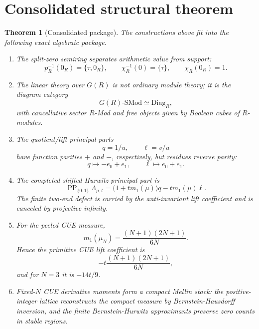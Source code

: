 \documentclass[11pt]{article}
\newcommand{\PP}{\operatorname{PP}}
\newcommand{\ellp}{\ell}
\newcommand{\1}{\mathbf 1}
\newcommand{\SMod}{\mathrm{SMod}}
\newcommand{\Diag}{\mathrm{Diag}}
\newtheorem{theorem}{Theorem}[section]
\numberwithin{equation}{section}
\begin{document}
\section{Consolidated structural theorem}\label{sec:synthesis}

\begin{theorem}[Consolidated package]\label{thm:consolidated}
The constructions above fit into the following exact algebraic package.
\begin{enumerate}[label=\textup{(\arabic*)},leftmargin=2.4em]
\item The split-zero semiring separates arithmetic value from support:
\begin{equation}
  p_R^{-1}(0_R)=\{\tau,0_R\},
  \qquad
  \chi_R^{-1}(0)=\{\tau\},
  \qquad
  \chi_R(0_R)=1.
\end{equation}
\item The linear theory over $G(R)$ is not ordinary module theory; it is the diagram category
\begin{equation}
  G(R)\text{-}\SMod\simeq\Diag_R,
\end{equation}
with cancellative sector $R$-Mod and free objects given by Boolean cubes of $R$-modules.
\item The quotient/lift principal parts
\begin{equation}
  q=1/u,
  \qquad
  \ellp=v/u
\end{equation}
have function parities $+$ and $-$, respectively, but residues reverse parity:
\begin{equation}
  q\mapsto -e_0+e_1,
  \qquad
  \ellp\mapsto e_0+e_1.
\end{equation}
\item The completed shifted-Hurwitz principal part is
\begin{equation}
  \PP_{\{0,1\}}\Lambda_{\mu,t}
  =\bigl(1+t m_1(\mu)\bigr)q-tm_1(\mu)\ellp.
\end{equation}
The finite two-end defect is carried by the anti-invariant lift coefficient and is canceled by projective infinity.
\item For the peeled CUE measure,
\begin{equation}
  m_1(\mu_N)=\frac{(N+1)(2N+1)}{6N}.
\end{equation}
Hence the primitive CUE lift coefficient is
\begin{equation}
  -t\frac{(N+1)(2N+1)}{6N},
\end{equation}
and for $N=3$ it is $-14t/9$.
\item Fixed-$N$ CUE derivative moments form a compact Mellin stack: the positive-integer lattice reconstructs the compact measure by Bernstein-Hausdorff inversion, and the finite Bernstein-Hurwitz approximants preserve zero counts in stable regions.

\end{enumerate}
\end{theorem}
\end{document}
